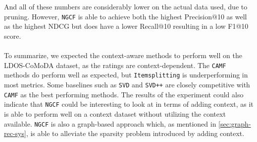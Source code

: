 And all of these numbers are considerably lower on the actual data used, due to pruning.
However, \texttt{NGCF} is able to achieve both the highest Precision@10 as well as the highest NDCG but does have a lower Recall@10 resulting in a low F1@10 score.
\\\\
To summarize, we expected the context-aware methods to perform well on the LDOS-CoMoDA dataset, as the ratings are context-dependent. 
The \texttt{CAMF} methods do perform well as expected, but \texttt{Itemsplitting} is underperforming in most metrics.
Some baselines such as \texttt{SVD} and \texttt{SVD++} are closely competitive with \texttt{CAMF} as the best performing methods.
The results of the experiment could also indicate that \texttt{NGCF} could be interesting to look at in terms of adding context, as it is able to perform well on a context dataset without utilizing the context available. 
\texttt{NGCF} is also a graph-based approach which, as mentioned in \autoref{sec:graph-rec-sys}, is able to alleviate the sparsity problem introduced by adding context.
